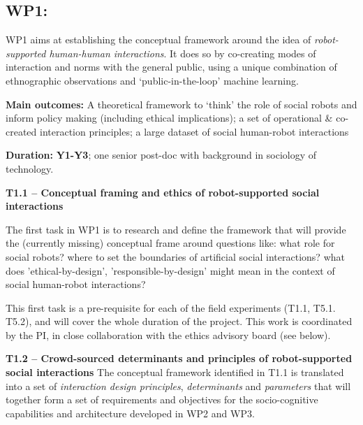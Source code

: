 \subsection{WP1: \textbf{\wpOne}}

WP1 aims at establishing the conceptual framework around the idea of
\emph{robot-supported human-human interactions}. It does so by co-creating
modes of interaction and norms with the general public, using a unique
combination of ethnographic observations and `public-in-the-loop' machine
learning.

\begin{framed}
    \textbf{Main outcomes:} A theoretical framework
to `think' the role of social robots and inform policy making (including ethical implications); a set
of operational \& co-created interaction principles; a large dataset of social
human-robot interactions

    \textbf{Duration:} \textbf{Y1-Y3}; one senior post-doc
with background in sociology of technology.
\end{framed}


\textbf{T1.1 -- Conceptual framing and ethics of robot-supported social
interactions}


The first task in WP1 is to research and define the framework that will provide the (currently missing) conceptual
frame around questions like: what role for social robots? where to set the
boundaries of artificial social interactions? what does 'ethical-by-design',
'responsible-by-design' might mean in the context of social human-robot
interactions? 


This first task is a pre-requisite for each of the field experiments (T1.1,
T5.1. T5.2), and will cover the whole duration of the project. This work is
coordinated by the PI, in close collaboration with the \project ethics advisory
board (see below).


\textbf{T1.2 -- Crowd-sourced determinants and principles of robot-supported social
interactions} The conceptual framework identified in T1.1 is translated
into a set of \emph{interaction design principles}, \emph{determinants} and
\emph{parameters} that will together form a set of requirements and objectives
for the socio-cognitive capabilities and architecture developed in WP2 and WP3.


